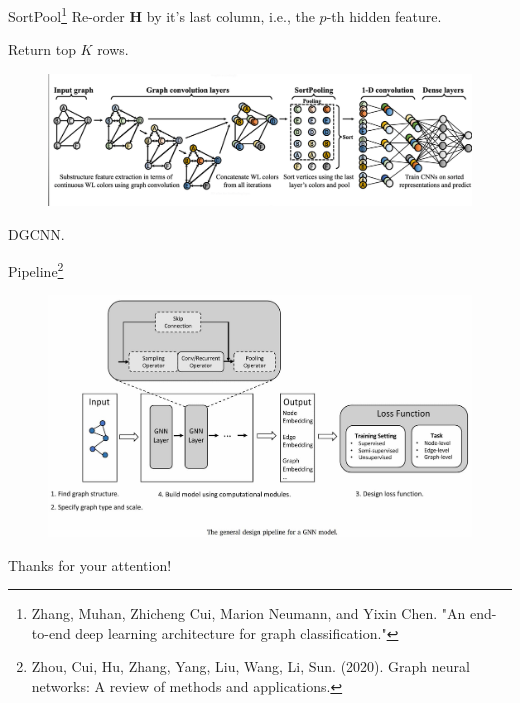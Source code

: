 \documentclass{beamer}
\begin{document}
\begin{frame}{SortPool\footnote{Zhang, Muhan, Zhicheng Cui, Marion Neumann, and Yixin Chen. "An end-to-end deep learning architecture for graph classification." }}
Re-order $\mathbf{H}$ by it's last column, i.e., the $p$-th hidden feature. 

Return top $K$ rows.
\begin{figure}
\includegraphics[width=0.95\linewidth]{Images/DCGNN.png}
\end{figure}
DGCNN.
\end{frame}
\begin{frame}{Pipeline\footnote{Zhou, Cui, Hu, Zhang, Yang, Liu, Wang, Li, Sun. (2020).
Graph neural networks: A review of methods and applications.}}
\begin{figure}
\includegraphics[width=0.95\linewidth]{Images/GNN_pipeline.jpg}
\end{figure}
\end{frame}
\begin{frame}
\begin{center}
\Huge Thanks for your attention!
\end{center}
\end{frame}
\end{document}
